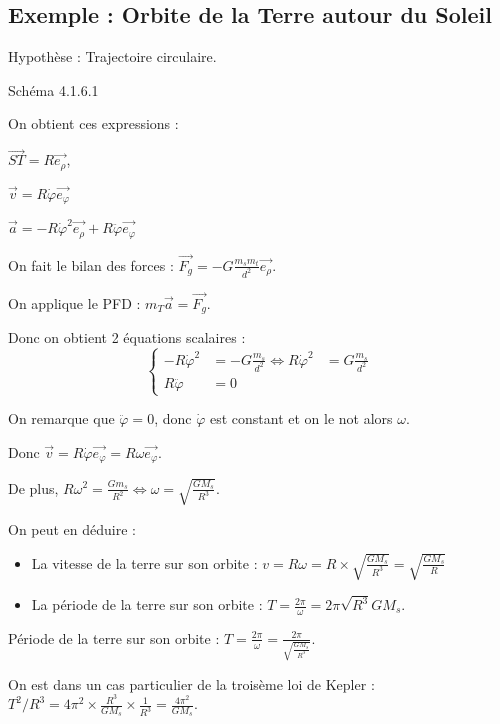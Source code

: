 \documentclass[french]{yLectureNote}
\renewcommand{\vec}{\overrightarrow}
\begin{document}
\subsection{Exemple : Orbite de la Terre autour du Soleil}

Hypothèse : Trajectoire circulaire.

Schéma 4.1.6.1

On obtient ces expressions :

$\vec{ST} = R\vec{e_{\rho}}$,

$\vec{v} = R\dot{\varphi}\vec{e_{\varphi}}$

$\vec{a} = -R\dot{\varphi}^2\vec{e_{\rho}} + R\ddot{\varphi}\vec{e_{\varphi}}$

On fait le bilan des forces : $\vec{F_g} = -G\frac{m_sm_t}{d^2}\vec{e_{\rho}}$.

On applique le PFD : $m_T\vec{a} = \vec{F_g}$.

Donc on obtient 2 équations scalaires :
\[\left\{\begin{matrix}
-R\dot{\varphi}^2 &= -G\frac{m_s}{d^2} \iff R\dot{\varphi}^2 &= G\frac{m_s}{d^2}\\
R\ddot{\varphi} &= 0
\end{matrix}\right.
\]

On remarque que $\ddot{\varphi} = 0$, donc $\dot{\varphi}$ est constant et on le not alors $\omega$.

Donc $\vec{v} = R\dot{\varphi}\vec{e_{\varphi}} = R\omega\vec{e_{\varphi}}$.

De plus, $R\omega^2 = \frac{Gm_s}{R^2} \iff \omega = \sqrt{\frac{GM_s}{R^3}}$.

On peut en déduire :
\begin{itemize}
 \item La vitesse de la terre sur son orbite : $v = R\omega = R \times \sqrt{\frac{GM_s}{R^3}} = \sqrt{\frac{GM_s}{R}}$
 \item La période de la terre sur son orbite : $T = \frac{2\pi}{\omega} = 2\pi \sqrt{R^3}{GM_s}$.
\end{itemize}


Période de la terre sur son orbite : $T = \frac{2\pi}{\omega} = \frac{2\pi}{\sqrt{\frac{GM_s}{R^3}}}$.

On est dans un cas particulier de la troisème loi de Kepler : $T^2/R^3 = 4\pi^2\times \frac{R^3}{GM_s}\times \frac{1}{R^3} = \frac{4\pi^2}{GM_s}$.
\end{document}
